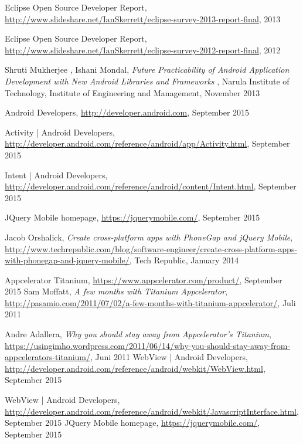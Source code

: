 \begin{thebibliography}{9}
	Eclipse Open Source Developer Report, 
	\url{http://www.slideshare.net/IanSkerrett/eclipse-survey-2013-report-final},
	2013
	
	Eclipse Open Source Developer Report, 
	\url{http://www.slideshare.net/IanSkerrett/eclipse-survey-2012-report-final},
	2012
	
	Shruti Mukherjee , Ishani Mondal, 
	\emph{Future Practicability of Android Application Development with New Android Libraries and Frameworks },
	Narula Institute of Technology, 
	Institute of Engineering and Management,
	November 2013 
	
	Android Developers,
	\url{http://developer.android.com},
	September 2015

	Activity | Android Developers,
	\url{http://developer.android.com/reference/android/app/Activity.html},
	September 2015
	
	Intent | Android Developers,
	\url{http://developer.android.com/reference/android/content/Intent.html},
	September 2015

	JQuery Mobile homepage,
	\url{https://jquerymobile.com/},
	September 2015

Jacob Orshalick,
\emph{Create cross-platform apps with PhoneGap and jQuery Mobile},
\url{http://www.techrepublic.com/blog/software-engineer/create-cross-platform-apps-with-phonegap-and-jquery-mobile/},
	Tech Republic,
	January 2014

	Appcelerator Titanium,
	\url{https://www.appcelerator.com/product/},
	September 2015
	Sam Moffatt,
	\emph{A few months with Titanium Appcelerator},
	\url{http://pasamio.com/2011/07/02/a-few-months-with-titanium-appcelerator/},
	Juli 2011

	Andre Adallera,
\emph{Why you should stay away from Appcelerator’s Titanium},
\url{https://usingimho.wordpress.com/2011/06/14/why-you-should-stay-away-from-appcelerators-titanium/},
	Juni 2011
	WebView | Android Developers,
	\url{http://developer.android.com/reference/android/webkit/WebView.html},
	September 2015

	WebView | Android Developers,
	\url{http://developer.android.com/reference/android/webkit/JavascriptInterface.html},
	September 2015
	JQuery Mobile homepage,
	\url{https://jquerymobile.com/},
	September 2015


\end{thebibliography}
